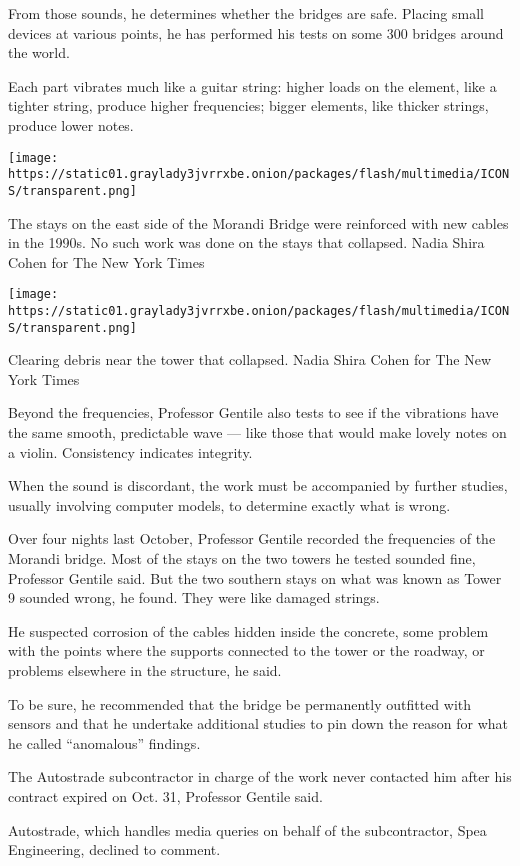 From those sounds, he determines whether the bridges are safe. Placing
small devices at various points, he has performed his tests on some 300
bridges around the world.

Each part vibrates much like a guitar string: higher loads on the
element, like a tighter string, produce higher frequencies; bigger
elements, like thicker strings, produce lower notes.

\texttt{[image: https://static01.graylady3jvrrxbe.onion/packages/flash/multimedia/ICONS/transparent.png]}

The stays on the east side of the Morandi Bridge were reinforced with
new cables in the 1990s. No such work was done on the stays that
collapsed. Nadia Shira Cohen for The New York Times

\texttt{[image: https://static01.graylady3jvrrxbe.onion/packages/flash/multimedia/ICONS/transparent.png]}

Clearing debris near the tower that collapsed. Nadia Shira Cohen for The
New York Times

Beyond the frequencies, Professor Gentile also tests to see if the
vibrations have the same smooth, predictable wave --- like those that
would make lovely notes on a violin. Consistency indicates integrity.

When the sound is discordant, the work must be accompanied by further
studies, usually involving computer models, to determine exactly what is
wrong.

Over four nights last October, Professor Gentile recorded the
frequencies of the Morandi bridge. Most of the stays on the two towers
he tested sounded fine, Professor Gentile said. But the two southern
stays on what was known as Tower 9 sounded wrong, he found. They were
like damaged strings.

He suspected corrosion of the cables hidden inside the concrete, some
problem with the points where the supports connected to the tower or the
roadway, or problems elsewhere in the structure, he said.

To be sure, he recommended that the bridge be permanently outfitted with
sensors and that he undertake additional studies to pin down the reason
for what he called ``anomalous'' findings.

The Autostrade subcontractor in charge of the work never contacted him
after his contract expired on Oct. 31, Professor Gentile said.

Autostrade, which handles media queries on behalf of the subcontractor,
Spea Engineering, declined to comment.

